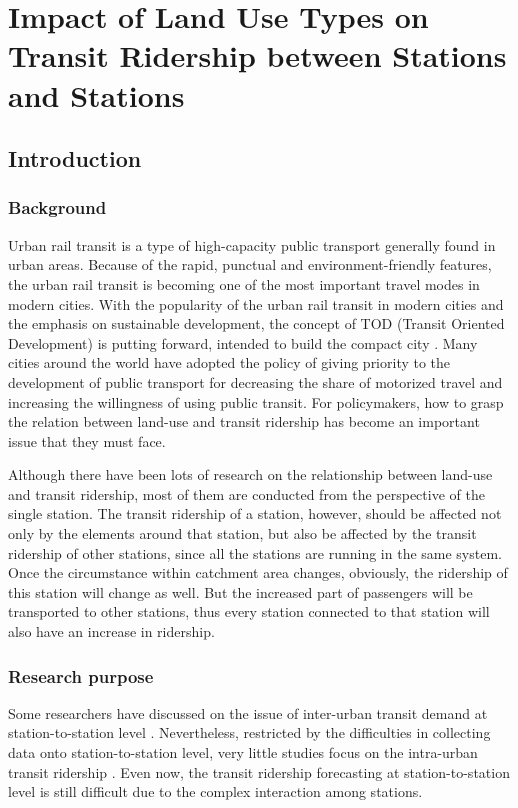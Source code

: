\chapter{Impact of Land Use Types on Transit Ridership between Stations and Stations}

\section{Introduction}
\subsection{Background}
%
Urban rail transit is a type of high-capacity public transport generally found in urban areas. Because of the rapid, punctual and environment-friendly features, the urban rail transit is becoming one of the most important travel modes in modern cities. With the popularity of the urban rail transit in modern cities and the emphasis on sustainable development, the concept of TOD (Transit Oriented Development) is putting forward, intended to build the compact city \cite{calthorpe1993next}. Many cities around the world have adopted the policy of giving priority to the development of public transport for decreasing the share of motorized travel and increasing the willingness of using public transit. For policymakers, how to grasp the relation between land-use and transit ridership has become an important issue that they must face.

%
Although there have been lots of research on the relationship between land-use and transit ridership, most of them are conducted from the perspective of the single station. The transit ridership of a station, however, should be affected not only by the elements around that station, but also be affected by the transit ridership of other stations, since all the stations are running in the same system.  Once the circumstance within catchment area changes, obviously, the ridership of this station will change as well. But the increased part of passengers will be transported to other stations, thus every station connected to that station will also have an increase in ridership. 

\subsection{Research purpose}
%
Some researchers have discussed on the issue of inter-urban transit demand at station-to-station level \cite{wardman1997inter,jones1983demand}. Nevertheless, restricted by the difficulties in collecting data onto station-to-station level, very little studies focus on the intra-urban transit ridership \cite{choi2012analysis}. Even now, the transit ridership forecasting at station-to-station level is still difficult due to the complex interaction among stations. 

